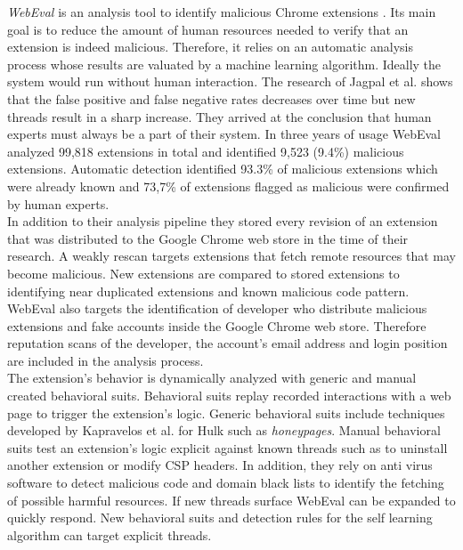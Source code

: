 	\textit{WebEval} is an analysis tool to identify malicious Chrome extensions \cite{190984}. Its main goal is to reduce the amount of human resources needed to verify that an extension is indeed malicious. Therefore, it relies on an automatic analysis process whose results are valuated by a machine learning algorithm. Ideally the system would run without human interaction. The research of Jagpal et al. shows that the false positive and false negative rates decreases over time but new threads result in a sharp increase. They arrived at the conclusion that human experts must always be a part of their system. In three years of usage WebEval analyzed 99,818 extensions in total and identified 9,523 (9.4\%) malicious extensions. Automatic detection identified 93.3\% of malicious extensions which were already known and 73,7\% of extensions flagged as malicious were confirmed by human experts. \\
	In addition to their analysis pipeline they stored every revision of an extension that was distributed to the Google Chrome web store in the time of their research. A weakly rescan targets extensions that fetch remote resources that may become malicious. New extensions are compared to stored extensions to identifying near duplicated extensions and known malicious code pattern. WebEval also targets the identification of developer who distribute malicious extensions and fake accounts inside the Google Chrome web store. Therefore reputation scans of the developer, the account's email address and login position are included in the analysis process.  \\
	The extension's behavior is dynamically analyzed with generic and manual created behavioral suits. Behavioral suits replay recorded interactions with a web page to trigger the extension's logic. Generic behavioral suits include techniques developed by Kapravelos	et al. for Hulk \cite{184485} such as \textit{honeypages}. Manual behavioral suits test an extension's logic explicit against known threads such as to uninstall another extension or modify CSP headers. In addition, they rely on anti virus software to detect malicious code and domain black lists to identify the fetching of possible harmful resources. If new threads surface WebEval can be expanded to quickly respond. New behavioral suits and detection rules for the self learning algorithm can target explicit threads. 
	
